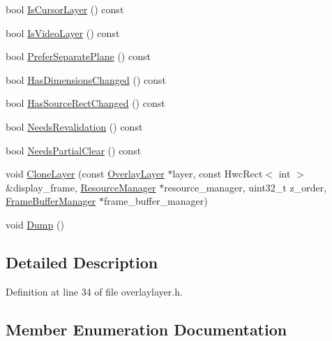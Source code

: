\begin{DoxyCompactItemize}
\item 
bool \mbox{\hyperlink{structhwcomposer_1_1OverlayLayer_afe4cd078f602d747f16a8099d1446904}{Is\+Cursor\+Layer}} () const
\item 
bool \mbox{\hyperlink{structhwcomposer_1_1OverlayLayer_ab6db6f0cd90e6d8bf3bda617e352848a}{Is\+Video\+Layer}} () const
\item 
bool \mbox{\hyperlink{structhwcomposer_1_1OverlayLayer_a93c05fdd136f9252a2a691adc71b5103}{Prefer\+Separate\+Plane}} () const
\item 
bool \mbox{\hyperlink{structhwcomposer_1_1OverlayLayer_aadef695001b19b87a0fbbea59145ec15}{Has\+Dimensions\+Changed}} () const
\item 
bool \mbox{\hyperlink{structhwcomposer_1_1OverlayLayer_a47f16228fcd6fec35b2724c60507c788}{Has\+Source\+Rect\+Changed}} () const
\item 
bool \mbox{\hyperlink{structhwcomposer_1_1OverlayLayer_adaf5a9e22bce479ad33036f810216412}{Needs\+Revalidation}} () const
\item 
bool \mbox{\hyperlink{structhwcomposer_1_1OverlayLayer_a04b86665a72d403550fe916276559695}{Needs\+Partial\+Clear}} () const
\item 
void \mbox{\hyperlink{structhwcomposer_1_1OverlayLayer_a223dac50fd143c675ae0a85e8e4c1ad7}{Clone\+Layer}} (const \mbox{\hyperlink{structhwcomposer_1_1OverlayLayer}{Overlay\+Layer}} $\ast$layer, const Hwc\+Rect$<$ int $>$ \&display\+\_\+frame, \mbox{\hyperlink{classhwcomposer_1_1ResourceManager}{Resource\+Manager}} $\ast$resource\+\_\+manager, uint32\+\_\+t z\+\_\+order, \mbox{\hyperlink{classhwcomposer_1_1FrameBufferManager}{Frame\+Buffer\+Manager}} $\ast$frame\+\_\+buffer\+\_\+manager)
\item 
void \mbox{\hyperlink{structhwcomposer_1_1OverlayLayer_a2ea53c727c5fd17bd1b9a90a66cb4069}{Dump}} ()
\end{DoxyCompactItemize}


\subsection{Detailed Description}


Definition at line 34 of file overlaylayer.\+h.



\subsection{Member Enumeration Documentation}
\mbox{\label{structhwcomposer_1_1OverlayLayer_a937ae4fd43f1005ad8c0c89a9673f1e1}} 
